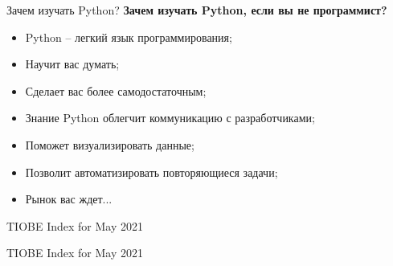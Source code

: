 \documentclass[12pt]{beamer}
\begin{document}
\begin{frame}{Зачем изучать Python?}
\textbf{Зачем изучать Python, если вы не программист?}
\vspace{0.5cm}
\begin{itemize}
\item Python – легкий язык программирования;
\item Научит вас думать;
\item Сделает вас более самодостаточным;
\item Знание Python облегчит коммуникацию с разработчиками;
\item Поможет визуализировать данные;
\item Позволит автоматизировать повторяющиеся задачи;
\item Рынок вас ждет...
\end{itemize}
\end{frame}

\begin{frame}{TIOBE Index for May 2021}
\end{frame}

\begin{frame}{TIOBE Index for May 2021}
\end{frame}
\end{document}
